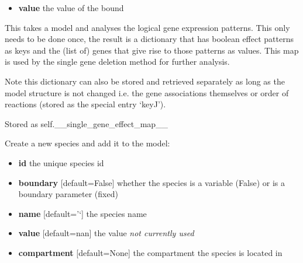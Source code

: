 \documentclass[a4paper,11pt,english]{sphinxmanual}
\begin{document}
\begin{fulllineitems}
\begin{fulllineitems}
\begin{itemize}
\item {} 
\textbf{value} the value of the bound

\end{itemize}

\end{fulllineitems}


\begin{fulllineitems}
\label{modules_doc:cbmpy.CBModel.Model.createSingleGeneEffectMap}
This takes a model and analyses the logical gene expression patterns. This only needs to be done once,
the result is a dictionary that has boolean effect patterns as keys and the (list of) genes that give rise to
those patterns as values. This map is used by the single gene deletion method for further analysis.

Note this dictionary can also be stored and retrieved separately as long as the model structure is not changed i.e.
the gene associations themselves or order of reactions (stored as the special entry `keyJ').

Stored as self.\_\_single\_gene\_effect\_map\_\_

\end{fulllineitems}


\begin{fulllineitems}
\label{modules_doc:cbmpy.CBModel.Model.createSpecies}
Create a new species and add it to the model:
\begin{itemize}
\item {} 
\textbf{id} the unique species id

\item {} 
\textbf{boundary} {[}default=False{]} whether the species is a variable (False) or is a boundary parameter (fixed)

\item {} 
\textbf{name} {[}default='`{]} the species name

\item {} 
\textbf{value} {[}default=nan{]} the value \emph{not currently used}

\item {} 
\textbf{compartment} {[}default=None{]} the compartment the species is located in


\end{itemize}
\end{fulllineitems}
\end{fulllineitems}
\end{document}
